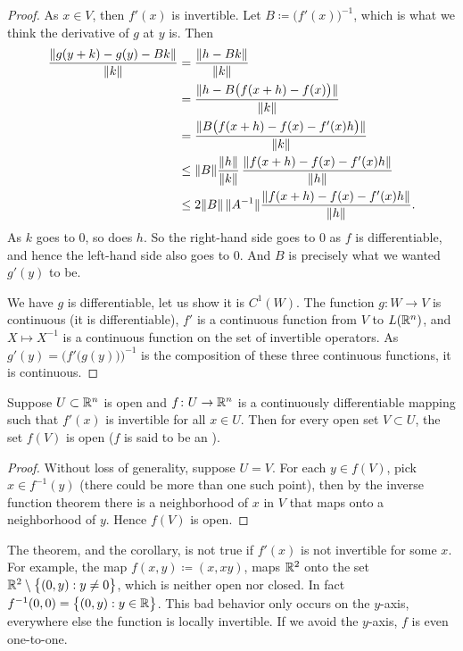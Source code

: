 \begin{proof}
As $x \in V$, then $f'(x)$ is invertible.
Let $B \coloneqq \bigl(f'(x)\bigr)^{-1}$, which is what we think the derivative of
$g$ at $y$ is.  Then
\begin{equation*}
\begin{split}
\frac{\lVert {g(y+k)-g(y)-Bk} \rVert}{\lVert {k} \rVert}
& =
\frac{\lVert {h-Bk} \rVert}{\lVert {k} \rVert}
\\
& =
\frac{\lVert {h-B\bigl(f(x+h)-f(x)\bigr)} \rVert}{\lVert {k} \rVert}
\\
& =
\frac{\lVert {B\bigl(f(x+h)-f(x)-f'(x)h\bigr)} \rVert}{\lVert {k} \rVert}
\\
& \leq
\lVert {B} \rVert
\frac{\lVert {h} \rVert}{\lVert {k} \rVert}\,
\frac{\lVert {f(x+h)-f(x)-f'(x)h} \rVert}{\lVert {h} \rVert}
\\
& \leq
2\lVert {B} \rVert \, \lVert {A^{-1}} \rVert
\frac{\lVert {f(x+h)-f(x)-f'(x)h} \rVert}{\lVert {h} \rVert} .
\end{split}
\end{equation*}
As $k$ goes to 0, so does $h$.  So the right-hand side goes to 0 as $f$ is
differentiable, and hence
the left-hand side also goes to 0.  And
$B$ is precisely what we wanted $g'(y)$ to be.

We have $g$ is differentiable, let us show it is $C^1(W)$.
The function $g \colon W \to V$ is continuous (it is differentiable),
$f'$ is a continuous function from $V$
to $L({\mathbb{R}}^n)$, and $X \mapsto X^{-1}$ is a continuous function on
the set of invertible operators.
As
$g'(y) = {\bigl( f'\bigl(g(y)\bigr)\bigr)}^{-1}$ is the composition
of these three
continuous functions, it is continuous.
\end{proof}

\begin{cor}
Suppose $U \subset {\mathbb{R}}^n$ is open and $f \colon U \to {\mathbb{R}}^n$ is a continuously
differentiable mapping such that $f'(x)$ is invertible for all $x \in U$.  Then
for every open set $V \subset U$, the set $f(V)$ is open ($f$ is said to be an
\emph{}).
\end{cor}

\begin{proof}
Without loss of generality, suppose $U=V$.
For each $y \in f(V)$, pick $x \in f^{-1}(y)$ (there could be more
than one such point), then by the inverse function theorem there is a
neighborhood of $x$ in $V$ that maps onto a neighborhood of $y$.  Hence
$f(V)$ is open.
\end{proof}

\begin{example}
The theorem, and the corollary, is not true if $f'(x)$ is not invertible for
some $x$.  For example,
the map $f(x,y) \coloneqq (x,xy)$, maps ${\mathbb{R}}^2$ onto the set
${\mathbb{R}}^2 \setminus \bigl\{ (0,y) : y \neq 0 \bigr\}$, which is neither open nor closed.
In fact $f^{-1}(0,0) = \bigl\{ (0,y) : y \in {\mathbb{R}} \bigr\}$.  This bad behavior
only occurs on the $y$-axis, everywhere else the function is locally
invertible.  If we avoid the $y$-axis, $f$ is even one-to-one.
\end{example}


